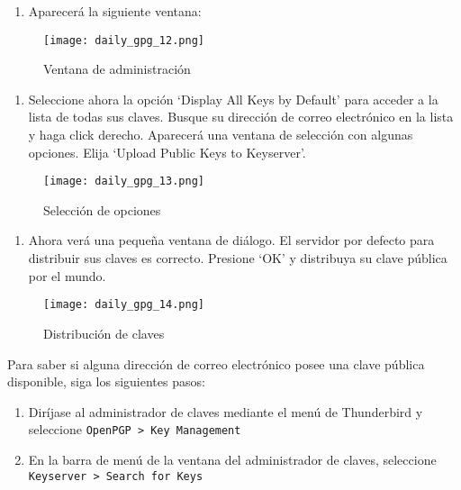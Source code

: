 \documentclass[10pt,a5paper,twoside,,]{book}
\providecommand{\tightlist}{%
  \setlength{\itemsep}{0pt}\setlength{\parskip}{0pt}}
\begin{document}
\begin{enumerate}
\def\labelenumi{\arabic{enumi}.}
\setcounter{enumi}{1}
\tightlist
\item
  Aparecerá la siguiente ventana:
\end{enumerate}

\begin{figure}[htbp]
\centering
\texttt{[image: daily\_gpg\_12.png]}
\caption{Ventana de administración}
\end{figure}

\begin{enumerate}
\def\labelenumi{\arabic{enumi}.}
\setcounter{enumi}{2}
\tightlist
\item
  Seleccione ahora la opción `Display All Keys by Default' para acceder
  a la lista de todas sus claves. Busque su dirección de correo
  electrónico en la lista y haga click derecho. Aparecerá una ventana de
  selección con algunas opciones. Elija `Upload Public Keys to
  Keyserver'.
\end{enumerate}

\begin{figure}[htbp]
\centering
\texttt{[image: daily\_gpg\_13.png]}
\caption{Selección de opciones}
\end{figure}

\begin{enumerate}
\def\labelenumi{\arabic{enumi}.}
\setcounter{enumi}{3}
\tightlist
\item
  Ahora verá una pequeña ventana de diálogo. El servidor por defecto
  para distribuir sus claves es correcto. Presione `OK' y distribuya su
  clave pública por el mundo.
\end{enumerate}

\begin{figure}[htbp]
\centering
\texttt{[image: daily\_gpg\_14.png]}
\caption{Distribución de claves}
\end{figure}

Para saber si alguna dirección de correo electrónico posee una clave
pública disponible, siga los siguientes pasos:

\begin{enumerate}
\def\labelenumi{\arabic{enumi}.}
\item
  Diríjase al administrador de claves mediante el menú de Thunderbird y
  seleccione \texttt{OpenPGP\ \textgreater{}\ Key\ Management}
\item
  En la barra de menú de la ventana del administrador de claves,
  seleccione \texttt{Keyserver\ \textgreater{}\ Search\ for\ Keys}
\end{enumerate}
\end{document}
